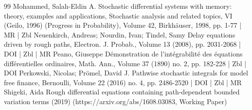 \begin{thebibliography}{99}
Mohammed, Salah-Eldin A. Stochastic differential systems with memory: theory, examples and applications, Stochastic analysis and related topics, VI (Geilo, 1996) (Progress in Probability), Volume 42, Birkhäuser, 1998, pp. 1-77 | MR | Zbl
Neuenkirch, Andreas; Nourdin, Ivan; Tindel, Samy Delay equations driven by rough paths, Electron. J. Probab., Volume 13 (2008), pp. 2031-2068 | DOI | Zbl | MR
Peano, Giuseppe Démonstration de l’intégrabilité des équations différentielles ordinaires, Math. Ann., Volume 37 (1890) no. 2, pp. 182-228 | Zbl | DOI
Perkowski, Nicolas; Prömel, David J. Pathwise stochastic integrals for model free finance, Bernoulli, Volume 22 (2016) no. 4, pp. 2486-2520 | DOI | Zbl | MR
Shigeki, Aida Rough differential equations containing path-dependent bounded variation terms (2019) (https://arxiv.org/abs/1608.03083, Working Paper)
\end{thebibliography}
